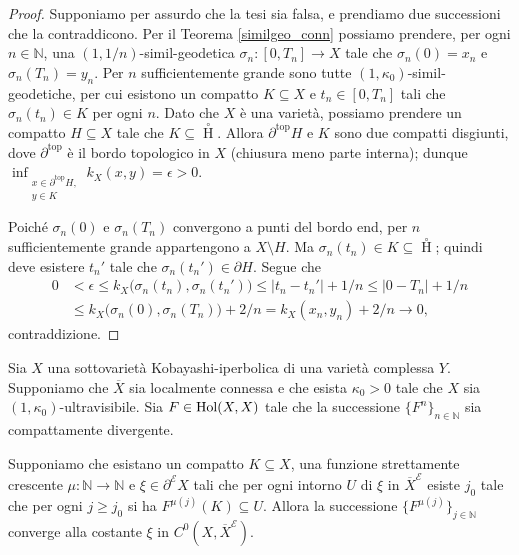 \begin{proof}
    Supponiamo per assurdo che la tesi sia falsa, e prendiamo due successioni che la contraddicono. Per il Teorema \ref{similgeo_conn} possiamo prendere, per ogni $n\in\mathbb{N}$, una $(1,1/n)$-simil-geodetica $\sigma_n:[0,T_n]\longrightarrow X$ tale che $\sigma_n(0)=x_n$ e ${\sigma_n(T_n)=y_n}$. Per $n$ sufficientemente grande sono tutte $(1,\kappa_0)$-simil-geodetiche, per cui esistono un compatto $K\subseteq X$ e $t_n\in[0,T_n]$ tali che $\sigma_n(t_n)\in K$ per ogni $n$. Dato che $X$ è una varietà, possiamo prendere un compatto ${H\subseteq X}$ tale che $K\subseteq{\mathop H\limits^ \circ}$. Allora $\partial^\text{top}H$ e $K$ sono due compatti disgiunti, dove $\partial^\text{top}$ è il bordo topologico in $X$ (chiusura meno parte interna); dunque ${\displaystyle\inf_{\substack{x\in\partial^\text{top}H,\\y\in K}} k_X(x,y)=\epsilon>0}$.

    Poiché $\sigma_n(0)$ e $\sigma_n(T_n)$ convergono a punti del bordo end, per $n$ sufficientemente grande appartengono a $X\setminus H$. Ma $\sigma_n(t_n)\in K\subseteq{\mathop H\limits^ \circ}$; quindi deve esistere $t_n'$ tale che $\sigma_n(t_n')\in\partial H$. Segue che
    \begin{align*}
        0&<\epsilon\le k_X\big(\sigma_n(t_n),\sigma_n(t_n')\big) \le |t_n-t_n'|+1/n\le |0-T_n|+1/n \\
        &\le k_X\big(\sigma_n(0),\sigma_n(T_n)\big)+2/n=k_X(x_n,y_n)+2/n\longrightarrow0,
    \end{align*}
    contraddizione.
\end{proof}

\begin{lm} \label{unaltrosottosotto}
    Sia $X$ una sottovarietà Kobayashi-iperbolica di una varietà complessa $Y$. Supponiamo che $\overline{X}$ sia localmente connessa e che esista $\kappa_0>0$ tale che $X$ sia $(1,\kappa_0)$-ultravisibile. Sia $F\in\textnormal{Hol}(X,X)$ tale che la successione $\{F^n\}_{n\in\mathbb{N}}$ sia compattamente divergente.
    
    Supponiamo che esistano un compatto $K\subseteq X$, una funzione strettamente crescente $\mu:\mathbb{N}\longrightarrow\mathbb{N}$ e $\xi\in\partial^\mathcal{E}X$ tali che per ogni intorno $U$ di $\xi$ in $\overline{X}^\mathcal{E}$ esiste $j_0$ tale che per ogni $j\ge j_0$ si ha $F^{\mu(j)}(K)\subseteq U$. Allora la successione $\{F^{\mu(j)}\}_{j\in\mathbb{N}}$ converge alla costante $\xi$ in $C^0(X,\overline{X}^\mathcal{E})$.
\end{lm}

